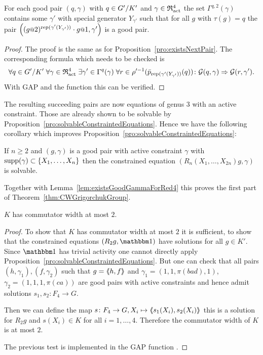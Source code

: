 \documentclass[a4paper,11pt]{amsart}
\begin{document}
\begin{pro}\label{pro:existsNextPair4}
 For each good pair $(q,\gamma)$ with $q\in{G'/K'}$ and $\gamma\in\mathfrak{R}^4_{\operatorname{act}}$ the set 
  $\Gamma^{q,2}(\gamma)$
 contains some $\gamma'$ with special generator $Y_{\gamma'}$ such that for all $g$ with $\tau(g)=q$ the
 pair $\left((g\at{2})^{\rep(\gamma'(Y_{\gamma'}))}\cdot g\at{1},\gamma'\right)$ is a good pair.
\end{pro}
\begin{proof}
The proof is the same as for Proposition~\ref{pro:existsNextPair}. The corresponding formula which needs to be checked is 
\[\forall q\in{G'/K'}\;
      \forall \gamma\in\mathfrak{R}^4_{\operatorname{act}}\;
	 \exists \gamma'\in \Gamma^q(\gamma)\;
	    \forall r\in \rho'^{-1}(\bar p_{\operatorname{rep}(\gamma'(Y_{\gamma'}))}(q))\colon
	      \mathcal{G}(q,\gamma) \Rightarrow \mathcal{G}(r,\gamma').\]
 With GAP and the function  this can be verified. 
\end{proof}
The resulting succeeding pairs are now equations of genus $3$ with an active constraint. 
Those are already shown to be solvable 
by Proposition~\ref{pro:solvableConstraintedEquations}. Hence we have the following
corollary which improves Proposition~\ref{pro:solvableConstraintedEquations}:
\begin{cor}\label{cor:solvableConstraintedEquations}
If $n\geq2$ and $(g,\gamma)$ is a good pair with active constraint $\gamma$ with $\operatorname{{supp}}(\gamma)\subset\{X_1,\dotsc,X_{n}\}$
 then the constrained equation $(R_n(X_1,\dotsc,X_{2n})g,\gamma)$ is solvable. 
\end{cor}
Together with Lemma~\ref{lem:existsGoodGammaForRed4} this proves the first part of Theorem~\ref{thm:CWGrigorchukGroup}.
\begin{cor}\label{cor:KhasCW2}
 $K$ has commutator width at most $2$. 
\end{cor}
\begin{proof}
 To show that $K$ has commutator width at most $2$ it is sufficient, to show that 
 the constrained equations $(R_2g,\id)$ have solutions for all $g\in K'$. 
 Since $\id$ has trivial activity one cannot directly apply 
 Proposition~\ref{pro:solvableConstraintedEquations}.  But one can check that all 
 pairs $(h,\gamma_1),(f,\gamma_2)$ such that $g=\langle\negthickspace\langle h,f\rangle\negthickspace\rangle$ and
 $\gamma_1=(1,1,\pi(bad),1)$, $\gamma_2=(1,1,1,\pi(ca))$ are good pairs with active
 constraints and hence admit solutions $s_1,s_2\colon F_4\to G$.
 
 Then we can define the map $s\colon F_4\to G, X_i\mapsto \langle\negthickspace\langle s_1(X_i),s_2(X_i)\rangle\negthickspace\rangle$ this is a solution
 for $R_2g$ and $s(X_i)\in K$ for all $i=1,\dotsc,4$. Therefore the commutator width of $K$ is at most $2$.
 
 The previous test is implemented in the GAP function . 
\end{proof}
\end{document}
